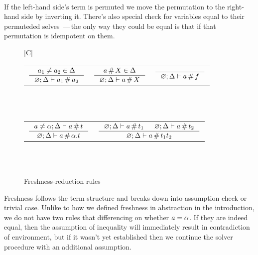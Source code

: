 \documentclass[english, mgr]{iithesis}
\newcommand{\solverRule}{\vdash}
\newcommand{\mdash}{\,---\,}
\def\-{{\mdash}}
\begin{document}
\\
If the left-hand side's term is permuted we move the permutation
to the right-hand side by inverting it.
There's also special check for variables equal to their permuteded selves
\-the only way they could be equal is that if that permutation is idempotent on them.

\begin{figure}[htbp]
    \centering
    \begin{tabularx}{\textwidth}{|C|}
      \hline \\
      \begin{tabular}{ccc}
      $
      \inference{
        \atomv_1 \cneq \atomv_2 \in \icEnv
      }{
        \emptyenv ; \icEnv \solverRule \atomv_1 \cfresh \atomv_2
      }
      $ & $
      \inference{
        \atomv \cfresh \termv \in \icEnv
      }{
        \emptyenv ; \icEnv \solverRule \atomv \cfresh \termv
      }
      $ & $
      \inference{
      }{
        \emptyenv ; \icEnv \solverRule \atomv \cfresh \symb
      }
      $
      \end{tabular}
      \\ \\
      \begin{tabular}{cc}
      $
      \inference{
        \atomv \cneq \atomexp ; \icEnv \solverRule \atomv \cfresh \term
      }{
        \emptyenv ; \icEnv \solverRule \atomv \cfresh \tbind{\atomexp}{\term}
      }
      $ &
      $
      \inference{
        \emptyenv ; \icEnv \solverRule \atomv \cfresh \term_1
        &
        \emptyenv ; \icEnv \solverRule \atomv \cfresh \term_2
      }{
        \emptyenv ; \icEnv \solverRule \atomv \cfresh \term_1 \term_2
      }
      $
      \end{tabular}
      \\ \\ \hline
      \end{tabularx}
  \caption{Freshness-reduction rules}
  \label{fig:freshness-rules}
\end{figure}
Freshness follows the term structure and breaks down into assumption check or trivial case.
Unlike to how we defined freshness in abstraction in the introduction,
we do not have two rules that differencing on whether $a = \alpha$.
If they are indeed equal, then the assumption of inequality will immediately
result in contradiction of environment, but if it wasn't yet established
then we continue the solver procedure with an additional assumption.
\end{document}
